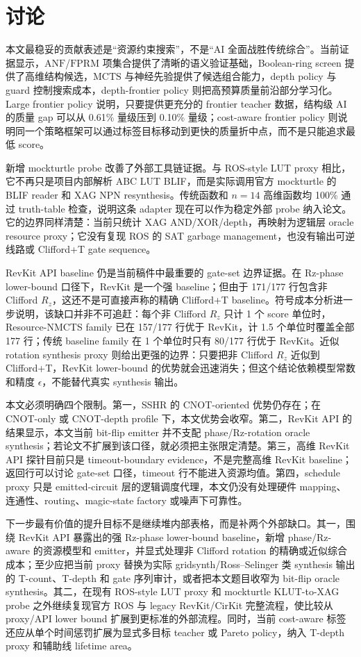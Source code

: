 \documentclass[UTF8,fontset=macnew,11pt]{ctexart}
\newcommand{\screen}{Boolean-ring screen}
\newcommand{\anf}{\ensuremath{\mathrm{ANF}}}
\newcommand{\fprm}{\ensuremath{\mathrm{FPRM}}}
\newcommand{\mcts}{\ensuremath{\mathrm{MCTS}}}
\begin{document}
\section{讨论}

本文最稳妥的贡献表述是“资源约束搜索”，不是“AI 全面战胜传统综合”。当前证据显示，\anf{}/\fprm{} 项集合提供了清晰的语义验证基础，\screen{} 提供了高维结构候选，\mcts{} 与神经先验提供了候选组合能力，depth policy 与 guard 控制搜索成本，depth-frontier policy 则把高预算质量前沿部分学习化。Large frontier policy 说明，只要提供更充分的 frontier teacher 数据，结构级 AI 的质量 gap 可以从 0.61\% 量级压到 0.10\% 量级；cost-aware frontier policy 则说明同一个策略框架可以通过标签目标移动到更快的质量折中点，而不是只能追求最低 score。

新增 mockturtle probe 改善了外部工具链证据。与 ROS-style LUT proxy 相比，它不再只是项目内部解析 ABC LUT BLIF，而是实际调用官方 mockturtle 的 BLIF reader 和 XAG NPN resynthesis。传统函数和 $n=14$ 高维函数均 100\% 通过 truth-table 检查，说明这条 adapter 现在可以作为稳定外部 probe 纳入论文。它的边界同样清楚：当前只统计 XAG AND/XOR/depth，再映射为逻辑层 oracle resource proxy；它没有复现 ROS 的 SAT garbage management，也没有输出可逆线路或 Clifford+T gate sequence。

RevKit API baseline 仍是当前稿件中最重要的 gate-set 边界证据。在 Rz-phase lower-bound 口径下，RevKit 是一个强 baseline；但由于 171/177 行包含非 Clifford $R_z$，这还不是可直接声称的精确 Clifford+T baseline。符号成本分析进一步说明，该缺口并非不可追赶：每个非 Clifford $R_z$ 只计 1 个 score 单位时，Resource-NMCTS family 已在 157/177 行优于 RevKit，计 1.5 个单位时覆盖全部 177 行；传统 baseline family 在 1 个单位时只有 80/177 行优于 RevKit。近似 rotation synthesis proxy 则给出更强的边界：只要把非 Clifford $R_z$ 近似到 Clifford+T，RevKit lower-bound 的优势就会迅速消失；但这个结论依赖模型常数和精度 $\epsilon$，不能替代真实 synthesis 输出。

本文必须明确四个限制。第一，SSHR 的 CNOT-oriented 优势仍存在；在 CNOT-only 或 CNOT-depth profile 下，本文优势会收窄。第二，RevKit API 的结果显示，本文当前 bit-flip emitter 并不支配 phase/Rz-rotation oracle synthesis；若论文不扩展到该口径，就必须把主张限定清楚。第三，高维 RevKit API 探针目前只是 timeout-boundary evidence，不是完整高维 RevKit baseline；返回行可以讨论 gate-set 口径，timeout 行不能进入资源均值。第四，schedule proxy 只是 emitted-circuit 层的逻辑调度代理，本文仍没有处理硬件 mapping、连通性、routing、magic-state factory 或噪声下可靠性。

下一步最有价值的提升目标不是继续堆内部表格，而是补两个外部缺口。其一，围绕 RevKit API 暴露出的强 Rz-phase lower-bound baseline，新增 phase/Rz-aware 的资源模型和 emitter，并显式处理非 Clifford rotation 的精确或近似综合成本；至少应把当前 proxy 替换为实际 gridsynth/Ross--Selinger 类 synthesis 输出的 T-count、T-depth 和 gate 序列审计，或者把本文题目收窄为 bit-flip oracle synthesis。其二，在现有 ROS-style LUT proxy 和 mockturtle KLUT-to-XAG probe 之外继续复现官方 ROS 与 legacy RevKit/CirKit 完整流程，使比较从 proxy/API lower bound 扩展到更标准的外部流程。同时，当前 cost-aware 标签还应从单个时间惩罚扩展为显式多目标 teacher 或 Pareto policy，纳入 T-depth proxy 和辅助线 lifetime area。
\end{document}

